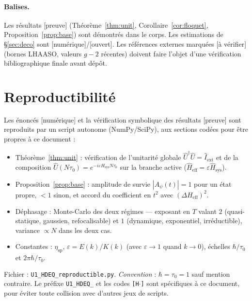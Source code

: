 \documentclass[11pt,a4paper]{article}
\newcommand{\Hsysop}{\hat{H}_{\mathrm{sys}}}
\newcommand{\Heff}{\hat{H}_{\mathrm{eff}}}
\newcommand{\Iext}{\hat{I}_{\mathrm{ext}}}
\newcommand{\statut}[1]{{\footnotesize\textsf{[#1]}}}
\theoremstyle{plain}
\theoremstyle{definition}
\theoremstyle{remark}
\begin{document}
\paragraph{Balises.} Les r\'esultats \statut{preuve} (Th\'eor\`eme~\ref{thm:unit},
Corollaire~\ref{cor:floquet}, Proposition~\ref{prop:base}) sont d\'emontr\'es dans le
corps. Les estimations de \S\ref{sec:deco} sont \statut{num\'erique}/\statut{ouvert}.
Les r\'ef\'erences externes marqu\'ees \statut{\`a v\'erifier} (bornes LHAASO, valeurs $g-2$
r\'ecentes) doivent faire l'objet d'une v\'erification bibliographique finale avant d\'ep\^ot.

\section*{Reproductibilit\'e}
Les \'enonc\'es \statut{num\'erique} et la v\'erification symbolique des r\'esultats
\statut{preuve} sont reproduits par un script autonome (NumPy/SciPy), aux sections
cod\'ees pour \^etre propres \`a ce document :
\begin{itemize}
\item[{\texttt{[H1]}}] Th\'eor\`eme~\ref{thm:unit} : v\'erification de l'unitarit\'e globale $\hat U^\dagger\hat U=\Iext$ et de la composition $\hat U(N\tau_0)=e^{-i\varepsilon\Hsysop N\tau_0}$ sur la branche active ($\Heff=\varepsilon\Hsysop$).
\item[{\texttt{[H2]}}] Proposition~\ref{prop:base} : amplitude de survie $|A_\psi(t)|=1$ pour un \'etat propre, $<1$ sinon, et accord du coefficient en $t^2$ avec $(\Delta H_{\mathrm{eff}})^2$.
\item[{\texttt{[H3]}}] D\'ephasage : Monte-Carlo des deux r\'egimes --- exposant en $T$ valant $2$ (quasi-statique, gaussien, refocalisable) et $1$ (dynamique, exponentiel, irr\'eductible), variance $\propto N$ dans les deux cas.
\item[{\texttt{[H4]}}] Constantes : $\eta_{\mathrm{sp}}$, $\varepsilon=E(k)/K(k)$ (avec $\varepsilon\to1$ quand $k\to0$), \'echelles $\hbar/\tau_0$ et $2\pi\hbar/\tau_0$.
\end{itemize}
Fichier : \texttt{U1\_HDEQ\_reproductible.py}. \emph{Convention} : $\hbar=\tau_0=1$ sauf
mention contraire. Le pr\'efixe \texttt{U1\_HDEQ\_} et les codes \texttt{[H$\cdot$]} sont
sp\'ecifiques \`a ce document, pour \'eviter toute collision avec d'autres jeux de scripts.
\end{document}
